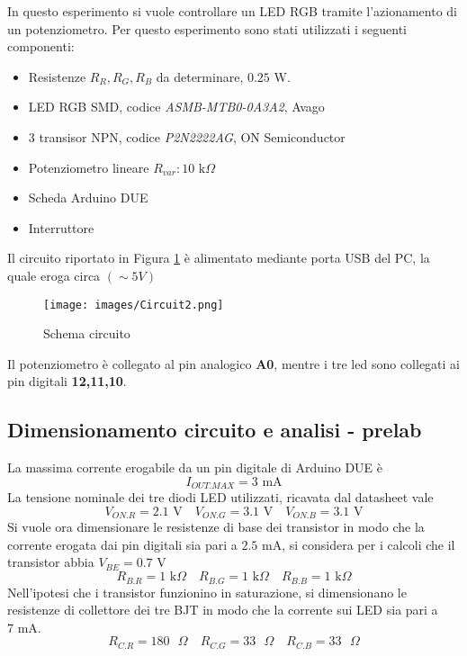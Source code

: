 In questo esperimento si vuole controllare un LED RGB tramite l'azionamento di un potenziometro. Per questo esperimento sono stati utilizzati i seguenti componenti:
\begin{itemize}
    \item Resistenze $R_R,R_G,R_B$ da determinare, $0.25$ W. 
    \item LED RGB SMD, codice \textit{ASMB-MTB0-0A3A2}, Avago
    \item 3 transisor NPN, codice \textit{P2N2222AG}, ON Semiconductor
    \item Potenziometro lineare $R_{var}:10\text{ k}\Omega$
    \item Scheda Arduino DUE
    \item Interruttore
\end{itemize}
Il circuito riportato in Figura \ref{fig:Circuit2} è alimentato mediante porta USB del PC, la quale eroga circa $(\sim 5 V)$
\begin{figure}[H]
    \centering
    \texttt{[image: images/Circuit2.png]}
    \caption{Schema circuito}
    \label{fig:Circuit2}
\end{figure}
\noindent Il potenziometro è collegato al pin analogico \textbf{A0}, mentre i tre led sono collegati ai pin digitali \textbf{12,11,10}.
\subsection{Dimensionamento circuito e analisi - prelab}
La massima corrente erogabile da un pin digitale di Arduino DUE è 
\begin{equation*}
    I_{OUT.MAX}=3\text{ mA}
\end{equation*}
La tensione nominale dei tre diodi LED utilizzati, ricavata dal datasheet vale
\begin{equation*}
    V_{ON.R}=2.1\text{ V}\quad V_{ON.G}=3.1\text{ V}\quad V_{ON.B}=3.1\text{ V}
\end{equation*}
Si vuole ora dimensionare le resistenze di base dei transistor in modo che la corrente erogata dai pin digitali sia pari a $2.5\text{ mA}$, si considera per i calcoli che il transistor abbia $V_{BE}=0.7\text{ V}$
\begin{equation*}
    R_{B.R}=1\text{ k$\Omega$}\quad R_{B.G}=1\text{ k$\Omega$}\quad R_{B.B}=1\text{ k$\Omega$}
\end{equation*}
Nell'ipotesi che i transistor funzionino in saturazione, si dimensionano le resistenze di collettore dei tre BJT in modo che la corrente sui LED sia pari a $7 \text{ mA}$.
\begin{equation*}
    R_{C.R}=180\text{ $\Omega$}\quad R_{C.G}=33\text{ $\Omega$}\quad R_{C.B}=33\text{ $\Omega$}
\end{equation*}
